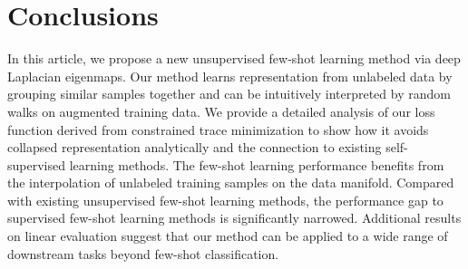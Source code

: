 \documentclass{article}
\begin{document}
\section{Conclusions} \label{sec:conclusion}
In this article, we propose a new unsupervised few-shot learning method via deep Laplacian eigenmaps. Our method learns representation from unlabeled data by grouping similar samples together and can be intuitively interpreted by random walks on augmented training data. We provide a detailed analysis of our loss function derived from constrained trace minimization to show how it avoids collapsed representation analytically and the connection to existing self-supervised learning methods. The few-shot learning performance benefits from the interpolation of unlabeled training samples on the data manifold. Compared with existing unsupervised few-shot learning methods, the performance gap to supervised few-shot learning methods is significantly narrowed. Additional results on linear evaluation suggest that our method can be applied to a wide range of downstream tasks beyond few-shot classification.



\end{document}
